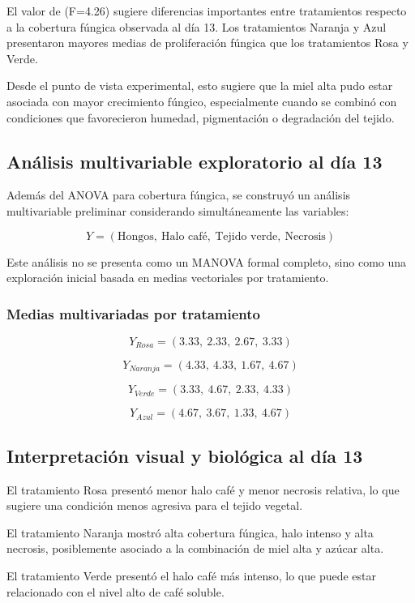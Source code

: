El valor de (F=4.26) sugiere diferencias importantes entre tratamientos respecto a la cobertura fúngica observada al día 13. Los tratamientos Naranja y Azul presentaron mayores medias de proliferación fúngica que los tratamientos Rosa y Verde.

Desde el punto de vista experimental, esto sugiere que la miel alta pudo estar asociada con mayor crecimiento fúngico, especialmente cuando se combinó con condiciones que favorecieron humedad, pigmentación o degradación del tejido.

\subsection{Análisis multivariable exploratorio al día 13}

Además del ANOVA para cobertura fúngica, se construyó un análisis multivariable preliminar considerando simultáneamente las variables:

\[
Y=(\text{Hongos},\ \text{Halo café},\ \text{Tejido verde},\ \text{Necrosis})
\]

Este análisis no se presenta como un MANOVA formal completo, sino como una exploración inicial basada en medias vectoriales por tratamiento.

\subsubsection{Medias multivariadas por tratamiento}

\[
Y_{Rosa}=(3.33,\ 2.33,\ 2.67,\ 3.33)
\]

\[
Y_{Naranja}=(4.33,\ 4.33,\ 1.67,\ 4.67)
\]

\[
Y_{Verde}=(3.33,\ 4.67,\ 2.33,\ 4.33)
\]

\[
Y_{Azul}=(4.67,\ 3.67,\ 1.33,\ 4.67)
\]

\subsection{Interpretación visual y biológica al día 13}

El tratamiento Rosa presentó menor halo café y menor necrosis relativa, lo que sugiere una condición menos agresiva para el tejido vegetal.

El tratamiento Naranja mostró alta cobertura fúngica, halo intenso y alta necrosis, posiblemente asociado a la combinación de miel alta y azúcar alta.

El tratamiento Verde presentó el halo café más intenso, lo que puede estar relacionado con el nivel alto de café soluble.

